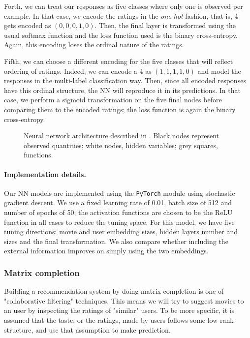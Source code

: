 \documentclass[bj, preprint]{imsart}
\begin{document}
Forth, we can treat our responses as five classes where only one is observed per example. In that case, we encode the ratings in the \textit{one-hot} fashion, that is, 4 gets encoded as $(0,0,0,1,0)$. Then, the final layer is transformed using the usual softmax function and the loss function used is the binary cross-entropy. Again, this encoding loses the ordinal nature of the ratings.

Fifth, we can choose a different encoding for the five classes that will reflect ordering of ratings. Indeed, we can encode a 4 as $(1,1,1,1,0)$ and model the responses in the multi-label classification way. Then, since all encoded responses have this ordinal structure, the NN will reproduce it in its predictions. In that case, we perform a sigmoid transformation on the five final nodes before comparing them to the encoded ratings; the loss function is again the binary cross-entropy.




\begin{figure}
\centering

\caption{Neural network architecture described in . Black nodes represent observed quantities; white nodes, hidden variables; grey squares, functions.}
\label{fig:method.models.nn}
\end{figure}

\paragraph{Implementation details.}\label{par:method.models.nn.impl}

Our NN models are implemented using the \texttt{PyTorch} module \citep{paszke2017automatic} using stochastic gradient descent. We use a fixed learning rate of \num{0.01}, batch size of \num{512} and number of epochs of \num{50}; the activation functions are chosen to be the ReLU function in all cases to reduce the tuning space. For this model, we have five tuning directions: movie and user embedding sizes, hidden layers number and sizes and the final transformation. We also compare whether including the external information improves on simply using the two embeddings.

\subsubsection{Matrix completion}\label{subsubsec:method.models.svd}
Building a recommendation system by doing matrix completion is one of "collaborative filtering" techniques. This means we will try to suggest movies to an user by inspecting the ratings of "similar" users. To be more specific, it is assumed that the taste, or the ratings, made by users follows some low-rank structure, and use that assumption to make prediction. 
\end{document}
